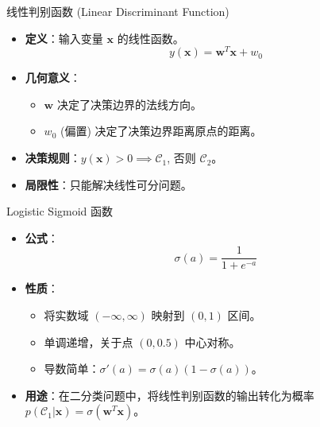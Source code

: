 \documentclass[12pt, aspectratio=169]{beamer}
\newcommand{\vect}[1]{\mathbf{#1}}
\begin{document}
\begin{frame}{线性判别函数 (Linear Discriminant Function)}
    \begin{itemize}
        \item \textbf{定义}：输入变量 $\vect{x}$ 的线性函数。
        $$ y(\vect{x}) = \vect{w}^T \vect{x} + w_0 $$
        \item \textbf{几何意义}：
        \begin{itemize}
            \item $\vect{w}$ 决定了决策边界的法线方向。
            \item $w_0$ (偏置) 决定了决策边界距离原点的距离。
        \end{itemize}
        \item \textbf{决策规则}：$y(\vect{x}) > 0 \implies \mathcal{C}_1$, 否则 $\mathcal{C}_2$。
        \item \textbf{局限性}：只能解决线性可分问题。
    \end{itemize}
\end{frame}

\begin{frame}{Logistic Sigmoid 函数}
    \begin{itemize}
        \item \textbf{公式}：
        $$ \sigma(a) = \frac{1}{1 + e^{-a}} $$
        \item \textbf{性质}：
        \begin{itemize}
            \item 将实数域 $(-\infty, \infty)$ 映射到 $(0, 1)$ 区间。
            \item 单调递增，关于点 $(0, 0.5)$ 中心对称。
            \item 导数简单：$\sigma'(a) = \sigma(a)(1-\sigma(a))$。
        \end{itemize}
        \item \textbf{用途}：在二分类问题中，将线性判别函数的输出转化为概率 $p(\mathcal{C}_1|\vect{x}) = \sigma(\vect{w}^T\vect{x})$。
    \end{itemize}
\end{frame}
\end{document}
